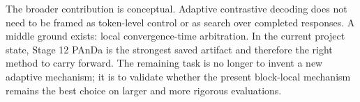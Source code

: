 \documentclass[10pt,twocolumn]{article}
\begin{document}
The broader contribution is conceptual. Adaptive contrastive decoding does not need to be framed as token-level control or as search over completed responses. A middle ground exists: local convergence-time arbitration. In the current project state, Stage 12 PAnDa is the strongest saved artifact and therefore the right method to carry forward. The remaining task is no longer to invent a new adaptive mechanism; it is to validate whether the present block-local mechanism remains the best choice on larger and more rigorous evaluations.



\end{document}
